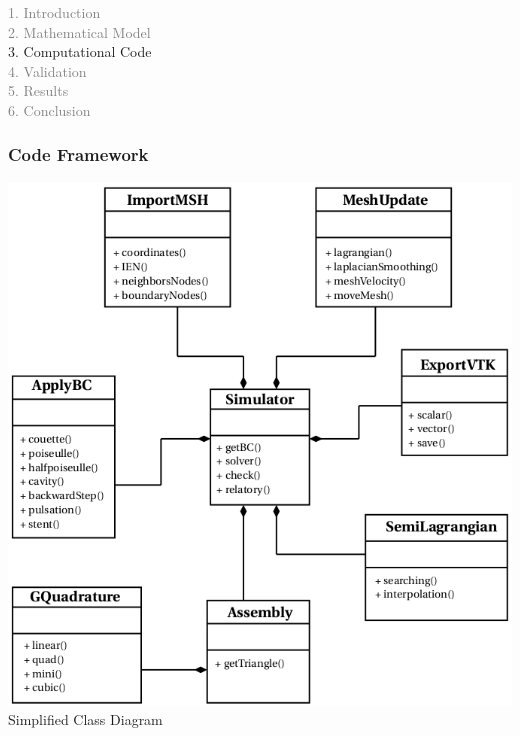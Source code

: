 

\iffalse
\begin{frame}
  \vspace{-1cm}
  \textcolor{gray}{1. Introduction}\\[0.1cm]
  \textcolor{gray}{2. Mathematical Model}\\[0.1cm]
  3. Computational Code\\[0.1cm]
  \textcolor{gray}{4. Validation}\\[0.1cm]
  \textcolor{gray}{5. Results}\\[0.1cm]
  \textcolor{gray}{6. Conclusion}
\end{frame}





\begin{frame}
 \frametitle{\LARGE Code Framework}
\vspace{-0.5cm}
\begin{center}
  \includegraphics[scale=0.3]{images/uml.png}\\[0.3cm]
  \caption{Simplified Class Diagram}
\end{center}
\end{frame}



